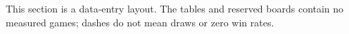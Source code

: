 This section is a data-entry layout. The tables and reserved boards contain no measured games; dashes do not mean draws or zero win rates.

